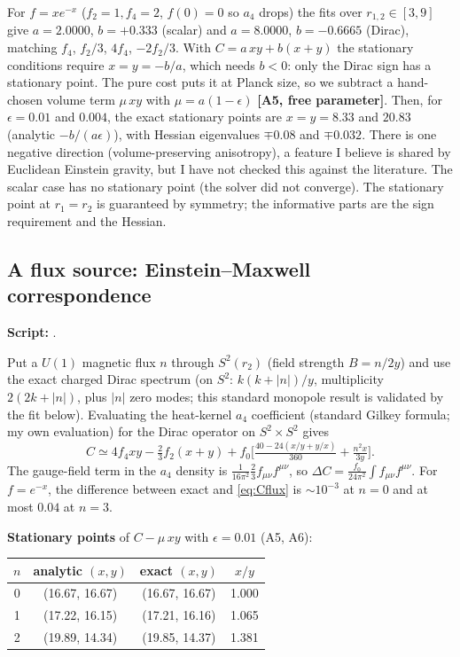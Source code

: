 \documentclass[11pt]{article}
\newcommand{\repo}{https://github.com/juhameskanen/abstract/blob/main/tests}
\newcommand{\testfile}[1]{\href{\repo/#1}{\texttt{\detokenize{#1}}}}
\newcommand{\flag}[1]{\textbf{[#1]}}
\begin{document}
For $f=xe^{-x}$ ($f_2=1,f_4=2$, $f(0)=0$ so $a_4$ drops) the fits over $r_{1,2}\in[3,9]$ give
$a=2.0000$, $b=+0.333$ (scalar) and $a=8.0000$, $b=-0.6665$ (Dirac), matching $f_4$, $f_2/3$, $4f_4$, $-2f_2/3$.
With $C=a\,xy+b(x+y)$ the stationary conditions require $x=y=-b/a$, which needs $b<0$: only the Dirac sign has a
stationary point. The pure cost puts it at Planck size, so we subtract a hand-chosen volume term
$\mu\,xy$ with $\mu=a(1-\epsilon)$ \flag{A5, free parameter}. Then, for $\epsilon=0.01$ and $0.004$, the exact stationary points
are $x=y=8.33$ and $20.83$ (analytic $-b/(a\epsilon)$), with Hessian eigenvalues $\mp 0.08$ and $\mp 0.032$.
There is one negative direction (volume-preserving anisotropy), a feature I believe is
shared by Euclidean Einstein gravity, but I have not checked this against the literature.
The scalar case has no stationary point (the solver did not converge).
The stationary point at $r_1=r_2$ is guaranteed by symmetry; the informative parts are the sign
requirement and the Hessian.


\subsection{A flux source: Einstein--Maxwell correspondence}
\label{sec:flux}
\textbf{Script:} \testfile{flux_s2xs2.py}.

Put a $U(1)$ magnetic flux $n$ through $S^2(r_2)$ (field strength $B=n/2y$) and use the exact charged Dirac spectrum
(on $S^2$: $k(k+|n|)/y$, multiplicity $2(2k+|n|)$, plus $|n|$ zero modes; this standard
monopole result is validated by the fit below). Evaluating the heat-kernel $a_4$ coefficient (standard Gilkey formula; my own evaluation)
for the Dirac operator on $S^2\times S^2$ gives
\begin{equation}
C\simeq4f_4xy-\tfrac23f_2(x+y)+f_0\Big[\tfrac{40-24(x/y+y/x)}{360}+\tfrac{n^2x}{3y}\Big].
\label{eq:Cflux}
\end{equation}
The gauge-field term in the $a_4$ density is $\tfrac1{16\pi^2}\tfrac23 f_{\mu\nu}f^{\mu\nu}$, so
$\Delta C=\tfrac{f_0}{24\pi^2}\int f_{\mu\nu}f^{\mu\nu}$. For $f=e^{-x}$, the difference between exact and
\eqref{eq:Cflux} is $\sim10^{-3}$ at $n=0$ and at most $0.04$ at $n=3$.

\textbf{Stationary points} of $C-\mu\,xy$ with $\epsilon=0.01$ (A5, A6):

\begin{center}
\small
\begin{tabular}{@{}cccc@{}}
\toprule
$n$ & analytic $(x,y)$ & exact $(x,y)$ & $x/y$\\
\midrule
0 & (16.67, 16.67) & (16.67, 16.67) & 1.000\\
1 & (17.22, 16.15) & (17.21, 16.16) & 1.065\\
2 & (19.89, 14.34) & (19.85, 14.37) & 1.381\\
\bottomrule
\end{tabular}
\end{center}
\end{document}
